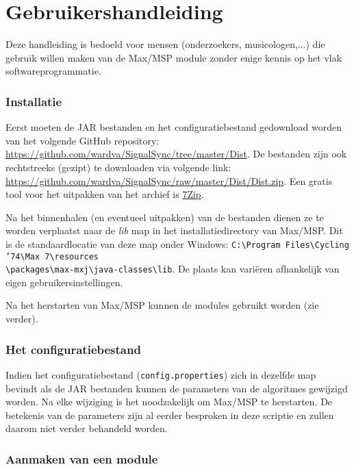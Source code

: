 \chapter{Gebruikershandleiding}
\label{appendix-d}

Deze handleiding is bedoeld voor mensen (onderzoekers, musicologen,...) die gebruik willen maken van de Max/MSP module zonder enige kennis op het vlak softwareprogrammatie.

\subsection*{Installatie}

Eerst moeten de JAR bestanden en het configuratiebestand gedownload worden van het volgende GitHub repository: \url{https://github.com/wardva/SignalSync/tree/master/Dist}. De bestanden zijn ook rechtstreeks (gezipt) te downloaden via volgende link: \url{https://github.com/wardva/SignalSync/raw/master/Dist/Dist.zip}. Een gratis tool voor het uitpakken van het archief is \href{http://www.7-zip.org/}{7Zip}.

Na het binnenhalen (en eventueel uitpakken) van de bestanden dienen ze te worden verplaatst naar de \emph{lib} map in het installatiedirectory van Max/MSP. Dit is de standaardlocatie van deze map onder Windows: \texttt{C:\textbackslash Program Files\textbackslash Cycling '74\textbackslash Max 7\textbackslash resources\\\textbackslash packages\textbackslash max-mxj\textbackslash java-classes\textbackslash lib}. De plaats kan variëren afhankelijk van eigen gebruikersinstellingen.

Na het herstarten van Max/MSP kunnen de modules gebruikt worden (zie verder).

\subsection*{Het configuratiebestand}

Indien het configuratiebestand (\texttt{config.properties}) zich in dezelfde map bevindt als de JAR bestanden kunnen de parameters van de algoritmes gewijzigd worden. Na elke wijziging is het noodzakelijk om Max/MSP te herstarten. De betekenis van de parameters zijn al eerder besproken in deze scriptie en zullen daarom niet verder behandeld worden.

\subsection*{Aanmaken van een module}


